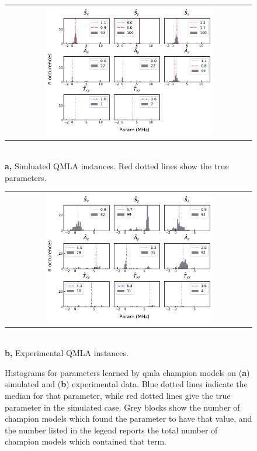 
\begin{figure}
    \centering
    \begin{tabular}{@{}c@{}}
        \centering
        \includegraphics[width=0.7\textwidth]{experimental_study/figures/params_simulation.pdf}
    \end{tabular}
    \\ \small \textbf{a,} Simluated QMLA instances. Red dotted lines show the true parameters.
    
    \centering
    \begin{tabular}{@{}c@{}}
        \centering
        \includegraphics[width=0.7\textwidth]{experimental_study/figures/params_experimental.pdf}
    \end{tabular}
    \\
    \small \textbf{b,} Experimental QMLA instances.
    \caption[
        Histograms for parameters learned by QMLA champion models on simulated and experimental data
    ]{
        Histograms for parameters learned by \gls{qmla} \glspl{champion model} on (\textbf{a}) simulated  and (\textbf{b}) experimental data. 
        Blue dotted lines indicate the median for that parameter, while red dotted lines give the true parameter in the simulated case. 
        Grey blocks show the number of champion models which found the parameter to have that value,
        and the number listed in the legend reports the total number of \glspl{champion model} which contained that term.
        \figtableref
    }
    \label{fig:nv_learned_params}
\end{figure}